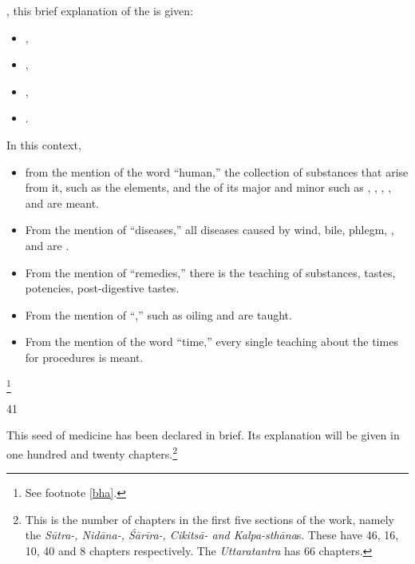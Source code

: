 \begin{translation}
    , this brief explanation of the 
    is given: \begin{itemize}
        \item    
        ,
        \item
        ,
        \item
        ,
        \item
        .
    \end{itemize}
    In this context, 
    \begin{itemize}
        \item from the mention of the word “human,” the collection of 
        substances that arise from it, such as the elements, and the 
         of its major 
        and minor  such as 
        , 
        , 
        , 
        , 
         and 
        are meant.
        \item
        From the mention of “diseases,” all diseases 
        caused by
        wind, bile, phlegm,
        ,
         and 
         are .
        \item
        From the mention of “remedies,”
        there is the teaching of 
        substances,
        tastes, 
        potencies,
        post-digestive tastes.
        \item
        From the mention of 
        “,”
         such as oiling
        and 
         are taught.
        \item
        From the mention of the word “time,” every single teaching about the times for
        procedures is meant. 
        
    \end{itemize}
    \footnote{See footnote \ref{bha}.}
    
    \item[41]
    
    \begin{sloka}
        This seed of medicine has been declared in brief.  Its explanation will be given in one 
        hundred and twenty chapters.\footnote{This is the number of chapters in the first 
        five sections of the work, namely the  \emph{Sūtra-, Nidāna-, Śārīra-, Cikitsā- 
        \emph{and} 
        Kalpa-sthāna}s. These have 46, 16, 10, 40 and 8 chapters respectively.  The 
        \emph{Uttaratantra} has 66 chapters.}
\end{sloka}


\end{translation}
